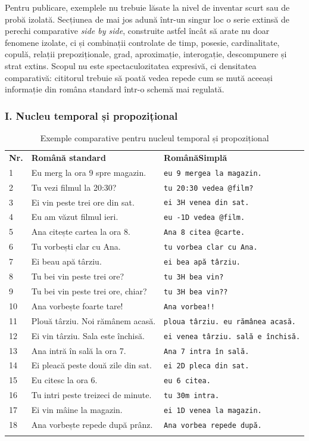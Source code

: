 \documentclass[12pt,onecolumn,letterpaper]{article}
\newcommand{\rs}[1]{\texttt{#1}}
\newcommand{\RSDenseTablelayout}{%
\footnotesize
\setlength{\tabcolsep}{4pt}%
\renewcommand{\arraystretch}{1.03}%
\setlength{\LTleft}{\fill}%
\setlength{\LTright}{\fill}%
\arrayrulecolor{RSRule}%
}
\begin{document}
Pentru publicare, exemplele nu trebuie lăsate la nivel de inventar scurt sau de
probă izolată.
Secțiunea de mai jos adună într-un singur loc o serie extinsă de perechi
comparative \textit{side by side}, construite astfel încât să arate nu doar
fenomene izolate, ci și combinații controlate de timp, posesie, cardinalitate,
copulă, relații prepoziționale, grad, aproximație, interogație, descompunere și
strat extins. Scopul nu este spectaculozitatea expresivă, ci densitatea
comparativă: cititorul trebuie să poată vedea repede cum se mută aceeași
informație din româna standard într-o schemă mai regulată.

\subsubsection{I. Nucleu temporal și propozițional}

\RSDenseTablelayout
\begin{longtable}{@{}p{0.5cm}p{5.45cm}p{5.45cm}@{}}
\rowcolor{RSGray}
\textbf{Nr.} & \textbf{Română standard} & \textbf{RomânăSimplă} \\
1 & Eu merg la ora 9 spre magazin. & \rs{eu 9 mergea la magazin.} \\
2 & Tu vezi filmul la 20:30? & \rs{tu 20:30 vedea @film?} \\
3 & Ei vin peste trei ore din sat. & \rs{ei 3H venea din sat.} \\
4 & Eu am văzut filmul ieri. & \rs{eu -1D vedea @film.} \\
5 & Ana citește cartea la ora 8. & \rs{Ana 8 citea @carte.} \\
6 & Tu vorbești clar cu Ana. & \rs{tu vorbea clar cu Ana.} \\
7 & Ei beau apă târziu. & \rs{ei bea apă târziu.} \\
8 & Tu bei vin peste trei ore? & \rs{tu 3H bea vin?} \\
9 & Tu bei vin peste trei ore, chiar? & \rs{tu 3H bea vin??} \\
10 & Ana vorbește foarte tare! & \rs{Ana vorbea!!} \\
11 & Plouă târziu. Noi rămânem acasă. & \rs{ploua târziu. eu rămânea acasă.} \\
12 & Ei vin târziu. Sala este închisă. & \rs{ei venea târziu. sală e închisă.} \\
13 & Ana intră în sală la ora 7. & \rs{Ana 7 intra în sală.} \\
14 & Ei pleacă peste două zile din sat. & \rs{ei 2D pleca din sat.} \\
15 & Eu citesc la ora 6. & \rs{eu 6 citea.} \\
16 & Tu intri peste treizeci de minute. & \rs{tu 30m intra.} \\
17 & Ei vin mâine la magazin. & \rs{ei 1D venea la magazin.} \\
18 & Ana vorbește repede după prânz. & \rs{Ana vorbea repede după.} \\
\bottomrule
\caption{Exemple comparative pentru nucleul temporal și propozițional}
\end{longtable}
\end{document}
